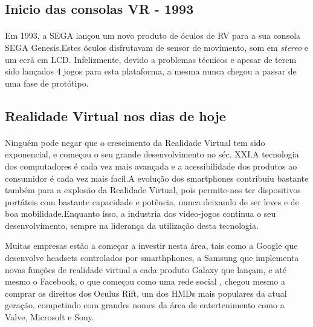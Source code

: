 \subsection{Inicio das consolas VR - 1993}
\paragraph{}
Em 1993, a SEGA lançou um novo produto de óculos de RV para a sua consola SEGA Genesis.Estes óculos disfrutavam de sensor de movimento, som em \textit{stereo} e um ecrã em LCD. Infelizmente, devido a problemas técnicos e apesar de terem sido lançados 4 jogos para esta plataforma, a mesma nunca chegou a passar de uma fase de protótipo.
\subsection{Realidade Virtual nos dias de hoje}
\paragraph{}
Ninguém pode negar que o crescimento da Realidade Virtual tem sido exponencial, e começou o seu grande desenvolvimento no séc. XXI.A tecnologia dos computadores é cada vez mais avançada e a acessibilidade dos produtos ao consumidor é cada vez mais facil.A evolução dos smartphones contribuiu bastante também para a explosão da Realidade Virtual, pois permite-nos ter dispositivos portáteis com bastante capacidade e potência, nunca deixando de ser leves e de boa mobilidade.Enquanto isso, a industria dos video-jogos continua o seu desenvolvimento, sempre na liderança da utilização desta tecnologia.

Muitas empresas estão a começar a investir nesta área, tais como a Google que desenvolve headsets controlados por smarthphones, a Samsung que implementa novas funções de realidade virtual a cada produto Galaxy que lançam, e até mesmo o Facebook, o que começou como uma rede social , chegou mesmo a comprar os direitos dos Oculus Rift, um dos HMDs mais populares da atual geração, competindo com grandes nomes da área de entertenimento como a Valve, Microsoft e Sony.




